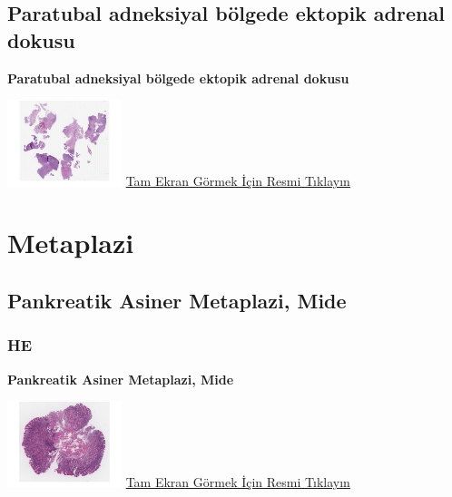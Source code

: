 \documentclass[
  letterpaper,
  DIV=11,
  numbers=noendperiod]{scrreprt}
\begin{document}
\hypertarget{sec-paratubal-adneksiyal-bolgede-ektopik-adrenal}{%
\section{Paratubal adneksiyal bölgede ektopik adrenal
dokusu}\label{sec-paratubal-adneksiyal-bolgede-ektopik-adrenal}}

\textbf{Paratubal adneksiyal bölgede ektopik adrenal dokusu}

\href{https://images.patolojiatlasi.com/ectopic-adrenal/HE.html}{\includegraphics[width=0.25\textwidth,height=\textheight]{./screenshots/ectopic-adrenal_screenshot.png}}
\href{https://images.patolojiatlasi.com/ectopic-adrenal/HE.html}{Tam
Ekran Görmek İçin Resmi Tıklayın}

\hypertarget{sec-metaplazi}{%
\chapter{Metaplazi}\label{sec-metaplazi}}

\hypertarget{sec-pankreatik-asiner-metaplazi}{%
\section{Pankreatik Asiner Metaplazi,
Mide}\label{sec-pankreatik-asiner-metaplazi}}

\hypertarget{he-6}{%
\subsection{HE}\label{he-6}}

\textbf{Pankreatik Asiner Metaplazi, Mide}

\href{https://images.patolojiatlasi.com/metaplasia/HE.html}{\includegraphics[width=0.25\textwidth,height=\textheight]{./screenshots/metaplasia_screenshot.png}}
\href{https://images.patolojiatlasi.com/metaplasia/HE.html}{Tam Ekran
Görmek İçin Resmi Tıklayın}
\end{document}
